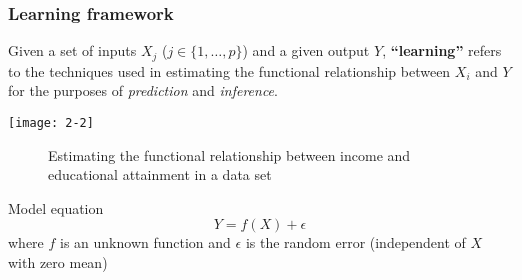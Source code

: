 \documentclass[usenames,dvipsnames,smaller]{beamer}
\newcommand{\?}{\stackrel{?}{=}}
\newcommand{\rd}{\color{red}}
\begin{document}
\begin{frame}
  \frametitle{Learning framework}
  Given a set of inputs $X_j$ ($j \in \{1, \ldots, p\}$) and a given output $Y$, {\bf \rd ``learning''} refers to the techniques used in estimating the functional relationship between $X_i$ and $Y$ for the purposes of \textit{prediction} and \textit{inference}.\\

  \pause

  \begin{minipage}[t]{.7\linewidth}
    \centering
    \texttt{[image: 2-2]}
  \end{minipage}
  \begin{minipage}[b]{.25\linewidth}
    \begin{figure}[h!]
    \caption{Estimating the functional relationship between income and educational attainment in a data set}
    \label{fig:in}
  \end{figure}
\end{minipage}

  \begin{block}{Model equation}
    \begin{equation}
      \label{eq:3}
      Y = f(X) + \epsilon      
    \end{equation}
    \pause
    where $f$ is an unknown function and $\epsilon$ is the random error (independent of $X$ with zero mean)
  \end{block}

\end{frame}
\end{document}
